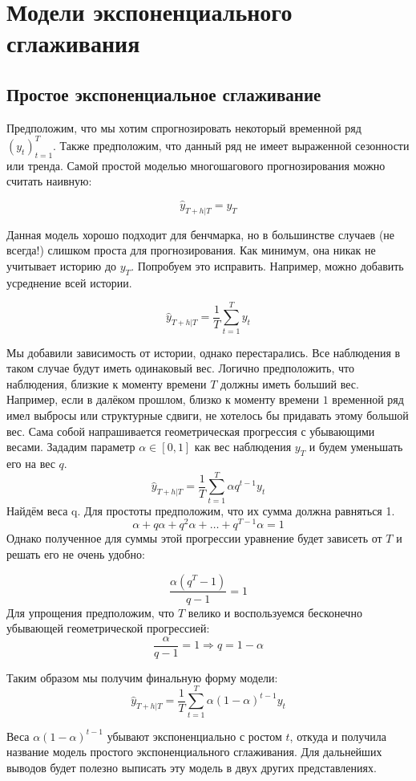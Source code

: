 \documentclass[12pt,fleqn]{article}
\begin{document}
\section{Модели экспоненциального сглаживания}

\subsection{Простое экспоненциальное сглаживание}

Предположим, что мы хотим спрогнозировать некоторый временной ряд $(y_t)_{t=1}^{T}$. Также предположим, что данный ряд не имеет выраженной сезонности или тренда. Самой простой моделью многошагового прогнозирования можно считать наивную:

$$
\hat{y}_{T+h|T} = y_T
$$

Данная модель хорошо подходит для бенчмарка, но в большинстве случаев (не всегда!) слишком проста для прогнозирования. Как минимум, она никак не учитывает историю до $y_T$. Попробуем это исправить. Например, можно добавить усреднение всей истории.


$$
\hat{y}_{T+h|T} = \frac{1}{T}\sum_{t=1}^{T}y_t
$$

Мы добавили зависимость от истории, однако перестарались. Все наблюдения в таком случае будут иметь одинаковый вес. Логично предположить, что наблюдения, близкие к моменту времени $T$ должны иметь больший вес. Например, если в далёком прошлом, близко к моменту времени $1$ временной ряд имел выбросы или структурные сдвиги, не хотелось бы придавать этому большой вес. Сама собой напрашивается геометрическая прогрессия с убывающими весами. Зададим параметр $\alpha \in [0, 1]$ как вес наблюдения $y_T$ и будем уменьшать его на вес $q$.
$$
\hat{y}_{T+h|T} = \frac{1}{T}\sum_{t=1}^{T} \alpha q^{t-1} y_t
$$
Найдём веса q. Для простоты предположим, что их сумма должна равняться 1. 
$$
\alpha + q \alpha + q^2 \alpha + \ldots + q^{T-1} \alpha = 1
$$
Однако полученное для суммы этой прогрессии уравнение будет  зависеть от $T$ и решать его не очень удобно:

$$
\frac{\alpha(q^T - 1)}{q-1} = 1
$$
Для упрощения предположим, что $T$ велико и воспользуемся бесконечно убывающей геометрической прогрессией:
$$
\frac{\alpha}{q-1} = 1 \Rightarrow q = 1-\alpha
$$

Таким образом мы получим финальную форму модели:
$$
\hat{y}_{T+h|T} = \frac{1}{T}\sum_{t=1}^{T} \alpha (1-\alpha)^{t-1} y_t
$$

Веса $ \alpha (1-\alpha)^{t-1} $ убывают экспоненциально с ростом $t$, откуда и получила название модель простого экспоненциального сглаживания.  Для дальнейших выводов будет полезно выписать эту модель в двух других представлениях.
\end{document}
